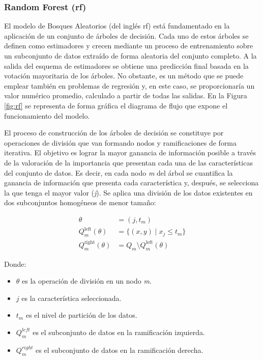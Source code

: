 \subsubsection{Random Forest (\acrshort{rf})}
\label{sec:mlrf}

El modelo de Bosques Aleatorios (del inglés \acrfull{rf}) está fundamentado en la aplicación de un conjunto de árboles de decisión. Cada uno de estos árboles se definen como estimadores y crecen mediante un proceso de entrenamiento sobre un subconjunto de datos extraído de forma aleatoria del conjunto completo. A la salida del esquema de estimadores se obtiene una predicción final basada en la votación mayoritaria de los árboles. No obstante, es un método que se puede emplear también en problemas de regresión y, en este caso, se proporcionaría un valor numérico promedio, calculado a partir de todas las salidas. En la Figura \ref{fig:rf} se representa de forma gráfica el diagrama de flujo que expone el funcionamiento del modelo. \cite{rfmedium}

\vspace{3mm}

El proceso de construcción de los árboles de decisión se constituye por operaciones de división que van formando nodos y ramificaciones de forma iterativa. El objetivo es lograr la mayor ganancia de información posible a través de la valoración de la importancia que presentan cada una de las características del conjunto de datos. Es decir, en cada nodo \textit{m} del árbol se cuantifica la ganancia de información que presenta cada característica y, después, se selecciona la que tenga el mayor valor (\textit{j}). Se aplica una división de los datos existentes en dos subconjuntos homogéneos de menor tamaño: \cite{rfmedium2}

\begin{equation}
    \begin{aligned}
        \theta &= (j, t_m) \\
        Q_m^{\text{left}}(\theta) &= \{(x, y) \mid x_j \leq t_m\} \\
        Q_m^{\text{right}}(\theta) &= Q_m \setminus Q_m^{\text{left}}(\theta)
    \end{aligned}
\end{equation}
    

Donde:
\begin{itemize}
    \renewcommand{\labelitemi}{}
    \item \( \theta \) es la operación de división en un nodo \textit{m}.
    \item \( j\) es la característica seleccionada.
    \item \( t_m\) es el nivel de partición de los datos.
    \item \( Q_m^{left}\) es el subconjunto de datos en la ramificación izquierda.
    \item \( Q_m^{right}\) es el subconjunto de datos en la ramificación derecha.
\end{itemize}

